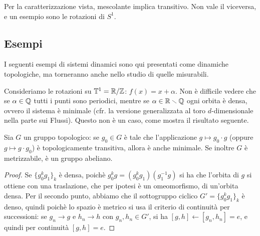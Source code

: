 \begin{oss} Per la caratterizzazione vista, mescolante implica transitivo. Non vale il viceversa, e un esempio sono le rotazioni di $S^1$. 
\end{oss}



\subsection{Esempi}

I seguenti esempi di sistemi dinamici sono qui presentati come dinamiche topologiche, ma torneranno anche nello studio di quelle misurabili.

\begin{esempio} Consideriamo le rotazioni su $\mathbb{T}^1=\mathbb{R}/\mathbb{Z}$: $f(x)=x+\alpha$. 
Non è difficile vedere che se $\alpha\in\mathbb{Q}$ tutti i punti sono periodici, mentre se $\alpha\in\mathbb{R}\smallsetminus\mathbb{Q}$ ogni orbita è densa, ovvero il sistema è minimale 
(cfr. la versione generalizzata al toro $d$-dimensionale nella parte sui Flussi). 
Questo non è un caso, come mostra il risultato seguente. \end{esempio}
\begin{lemma}[facoltativo] Sia $G$ un gruppo topologico: se $g_0\in G$ è tale che l'applicazione $g\mapsto g_0\cdot g$ (oppure $g\mapsto g\cdot g_0$) è topologicamente transitiva, 
allora è anche minimale. Se inoltre $G$ è metrizzabile, è un gruppo abeliano. 
\end{lemma}
\begin{proof}
 Se $\{g_0^kg_1\}_k$ è densa, poichè $g_0^kg=(g_0^kg_1)(g_1^{-1}g)$ si ha che l'orbita di $g$ si ottiene con una traslazione, che per ipotesi è un omeomorfismo, di un'orbita densa. 
 Per il secondo punto, abbiamo che il sottogruppo ciclico $G'=\{g_0^kg_1\}_k$ è denso, quindi poichè lo spazio è metrico si usa il criterio di continuità per successioni: 
 se $g_n\rightarrow g$ e $h_n\rightarrow h$ con $g_n, h_n \in G'$, si ha $[g,h]\leftarrow [g_n,h_n]=e$, e quindi per continuità $[g,h]=e$.
\end{proof}




